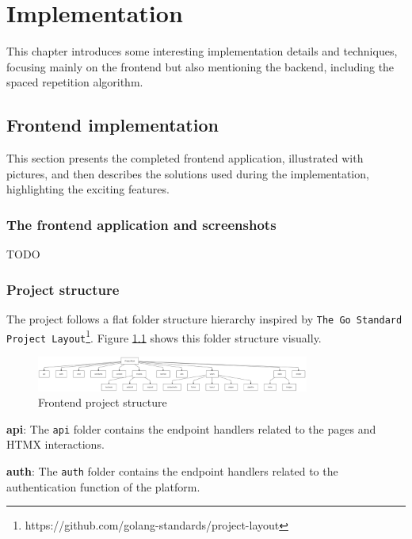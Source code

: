 \chapter{Implementation}

This chapter introduces some interesting implementation details and techniques, focusing mainly on the frontend but also mentioning the backend, including the spaced repetition algorithm.


\section{Frontend implementation}

This section presents the completed frontend application, illustrated with pictures, and then describes the solutions used during the implementation, highlighting the exciting features.

\subsection{The frontend application and screenshots}

TODO

\subsection{Project structure}

The project follows a flat folder structure hierarchy inspired by \texttt{The Go Standard Project Layout}\footnote{https://github.com/golang-standards/project-layout}. Figure \ref{fig:frontend-project-structure} shows this folder structure visually.

\begin{figure}[H]
    \centering
    \includegraphics[width=0.8\textwidth, keepaspectratio]{figures/frontend-project-structure.png}
    \caption{Frontend project structure}
    \label{fig:frontend-project-structure}
\end{figure}

\textbf{api}: The \texttt{api} folder contains the endpoint handlers related to the pages and HTMX interactions.

\textbf{auth}: The \texttt{auth} folder contains the endpoint handlers related to the authentication function of the platform.

